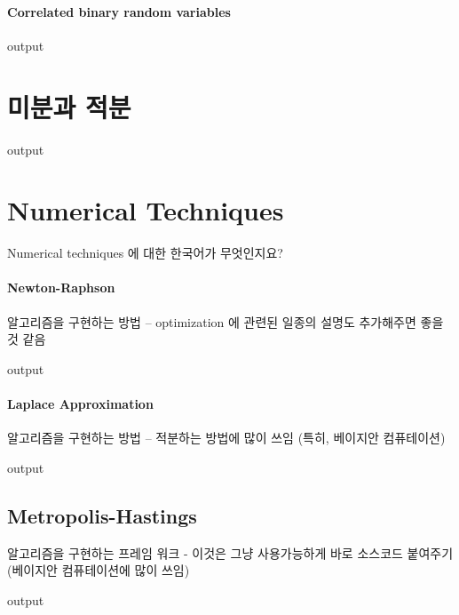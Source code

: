\documentclass[../tutorial.tex]{subfiles}
\begin{document}
\paragraph{Correlated binary random variables}
\begin{Schunk}
\begin{Soutput}
output
\end{Soutput}
\end{Schunk}





\section{미분과 적분}
\begin{Schunk}
\begin{Soutput}
output
\end{Soutput}
\end{Schunk}


\section{Numerical Techniques}

Numerical techniques 에 대한 한국어가 무엇인지요?

\paragraph{Newton-Raphson} 알고리즘을 구현하는 방법 -- optimization 에 관련된 일종의 설명도 추가해주면 좋을 것 같음 
\begin{Schunk}
\begin{Soutput}
output
\end{Soutput}
\end{Schunk}

\paragraph{Laplace Approximation} 알고리즘을 구현하는 방법 -- 적분하는 방법에 많이 쓰임 (특히, 베이지안 컴퓨테이션) 
\begin{Schunk}
\begin{Soutput}
output
\end{Soutput}
\end{Schunk}



\subsection{Metropolis-Hastings} 알고리즘을 구현하는 프레임 워크 - 이것은 그냥 사용가능하게 바로 소스코드 붙여주기 (베이지안 컴퓨테이션에 많이 쓰임)
\begin{Schunk}
\begin{Soutput}
output
\end{Soutput}
\end{Schunk}
\end{document}
